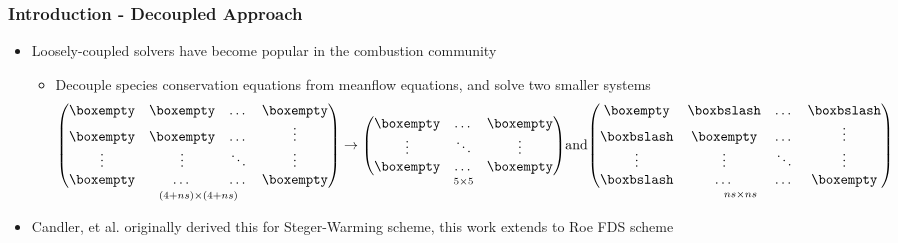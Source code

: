 \documentclass{beamer}
\begin{document}
\begin{frame}
  \frametitle{Introduction - Decoupled Approach}
  \begin{itemize}
    \item Loosely-coupled solvers have become popular in the combustion
      community
      \begin{itemize}
        \item Decouple species conservation equations from meanflow equations,
          and solve two smaller systems
         \[
           \underset{(4+ns) \times (4+ns)}
           {\begin{pmatrix}
             \boxempty & \boxempty & \dots  & \boxempty \\
             \boxempty & \boxempty & \dots  & \vdots \\
             \vdots    & \vdots    & \ddots & \vdots \\
             \boxempty & \dots     & \dots  & \boxempty
           \end{pmatrix}}
           \to
           \underset{5 \times 5}
           {\begin{pmatrix}
             \boxempty & \dots  & \boxempty \\
             \vdots    & \ddots & \vdots \\
             \boxempty & \dots  & \boxempty
           \end{pmatrix}}
           \text{and}
           \underset{ns \times ns}
           {\begin{pmatrix}
             \boxempty  & \boxbslash & \dots  & \boxbslash \\
             \boxbslash & \boxempty  & \dots  & \vdots \\
             \vdots     & \vdots     & \ddots & \vdots \\
             \boxbslash & \dots      & \dots  & \boxempty
           \end{pmatrix}}
         \]
    \end{itemize}
  \item Candler, et al. originally derived this for
    Steger-Warming scheme, this work extends to Roe FDS scheme
  \end{itemize}
\end{frame}
\end{document}
